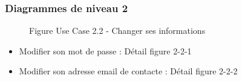 \documentclass[a4paper, 11pt]{article}
\begin{document}
        \subsubsection{ Diagrammes de niveau 2}
	\begin{figure}[h]
        \caption{Figure Use Case 2.2 - Changer ses informations}
        \label{fig-diag-use-case-2-2}
        \end{figure}
        \begin{itemize}
        \item Modifier son mot de passe : Détail figure 2-2-1
        \item Modifier son adresse email de contacte : Détail figure 2-2-2
        \end{itemize}
        \clearpage
\end{document}
